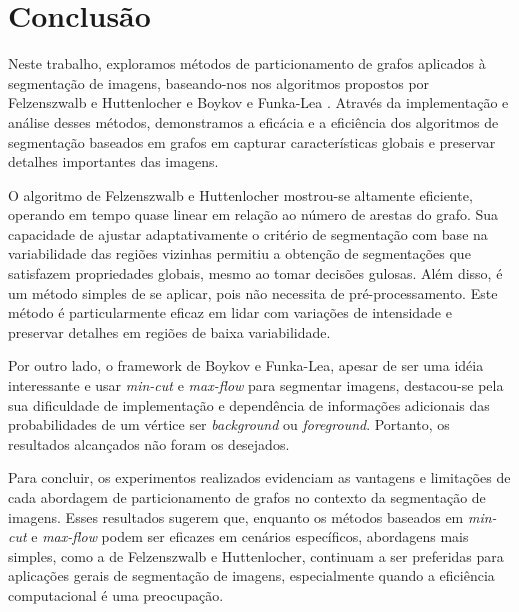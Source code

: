 \documentclass[12pt]{article}
\begin{document}
 
\section{Conclusão}
Neste trabalho, exploramos métodos de particionamento de grafos aplicados à segmentação de imagens, baseando-nos nos algoritmos propostos por Felzenszwalb e Huttenlocher \cite{felzenszwalb2004efficient} e Boykov e Funka-Lea \cite{boykov2006graph}. Através da implementação e análise desses métodos, demonstramos a eficácia e a eficiência dos algoritmos de segmentação baseados em grafos em capturar características globais e preservar detalhes importantes das imagens.

O algoritmo de Felzenszwalb e Huttenlocher mostrou-se altamente eficiente, operando em tempo quase linear em relação ao número de arestas do grafo. Sua capacidade de ajustar adaptativamente o critério de segmentação com base na variabilidade das regiões vizinhas permitiu a obtenção de segmentações que satisfazem propriedades globais, mesmo ao tomar decisões gulosas. Além disso, é um método simples de se aplicar, pois não necessita de pré-processamento. Este método é particularmente eficaz em lidar com variações de intensidade e preservar detalhes em regiões de baixa variabilidade. 

Por outro lado, o framework de Boykov e Funka-Lea, apesar de ser uma idéia interessante e usar \textit{min-cut} e \textit{max-flow} para segmentar imagens, destacou-se pela sua dificuldade de implementação e dependência de informações adicionais das probabilidades de um vértice ser \textit{background} ou \textit{foreground}. Portanto, os resultados alcançados não foram os desejados.

Para concluir, os experimentos realizados evidenciam as vantagens e limitações de cada abordagem de particionamento de grafos no contexto da segmentação de imagens. Esses resultados sugerem que, enquanto os métodos baseados em \textit{min-cut} e \textit{max-flow} podem ser eficazes em cenários específicos, abordagens mais simples, como a de Felzenszwalb e Huttenlocher, continuam a ser preferidas para aplicações gerais de segmentação de imagens, especialmente quando a eficiência computacional é uma preocupação.




\end{document}
